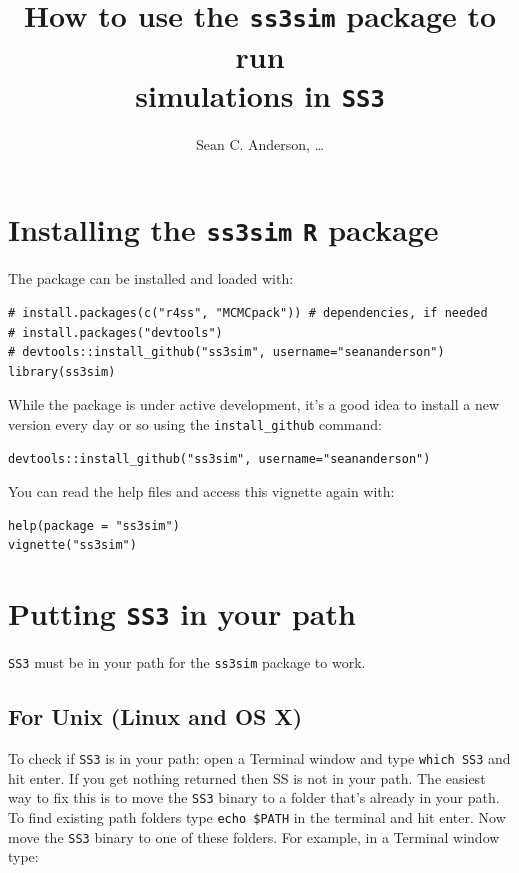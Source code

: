 \documentclass[12pt]{article}
\title{How to use the \texttt{ss3sim} package to run\\simulations in \texttt{SS3}}
\author{Sean C. Anderson, \ldots}
\date{}
\begin{document}
\maketitle

\section{Installing the \texttt{ss3sim} \texttt{R} package}

The package can be installed and loaded with:

\begin{verbatim}
# install.packages(c("r4ss", "MCMCpack")) # dependencies, if needed
# install.packages("devtools")
# devtools::install_github("ss3sim", username="seananderson")
library(ss3sim)
\end{verbatim}

\noindent
While the package is under active development, it's a good idea to install a 
new version every day or so using the \texttt{install\_github} command:

\begin{verbatim}
devtools::install_github("ss3sim", username="seananderson")
\end{verbatim}

\noindent
You can read the help files and access this vignette again with:

\begin{verbatim}
help(package = "ss3sim")
vignette("ss3sim")
\end{verbatim}

\section{Putting \texttt{SS3} in your path}
\texttt{SS3} must be in your path for the \texttt{ss3sim} package to work.

\subsection{For Unix (Linux and OS X)}
To check if \texttt{SS3} is in your path: open a Terminal window and type 
\texttt{which SS3} and hit enter. If you get nothing returned then SS is not in 
your path. The easiest way to fix this is to move the \texttt{SS3} binary to a 
folder that's already in your path. To find existing path folders type 
\texttt{echo \$PATH} in the terminal and hit enter. Now move the \texttt{SS3} 
binary to one of these folders. For example, in a Terminal window type:
\end{document}
